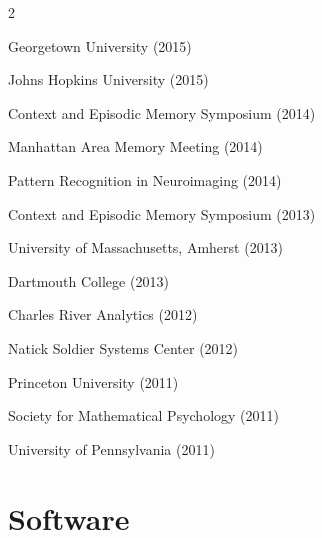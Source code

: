 \documentclass[11pt, a4paper]{article} %
\begin{document}
\begin{multicols}{2}
\begin{etaremune}
\item Georgetown University (2015)
\item Johns Hopkins University (2015)
\item Context and Ep\-is\-od\-ic Mem\-o\-ry Symposium (2014)
\item Manhattan Area Memory Meeting (2014)
\item Pattern Recognition in Neuroimaging (2014)
\item Context and Episodic Memory Symposium (2013)
\item University of Massachusetts, Amherst (2013)
\item Dartmouth College (2013)
\item Charles River Analytics (2012)
\item Natick Soldier Systems Center (2012)
\item Princeton University (2011)
\item Society for Mathematical Psychology (2011)
\item University of Pennsylvania (2011)
\end{etaremune}
\end{multicols}
  
\section*{Software}
\end{document}
